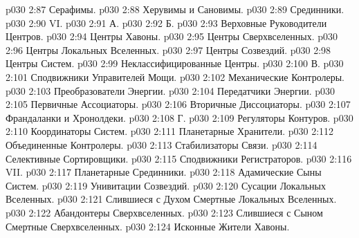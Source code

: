 \vs p030 2:87 \bibnobreakspace Серафимы.
\vs p030 2:88 \bibnobreakspace Херувимы и Сановимы.
\vs p030 2:89 \bibnobreakspace Срединники.
\vs p030 2:90 \pc VI. 
\vs p030 2:91 \pc А. 
\vs p030 2:92 \pc Б. 
\vs p030 2:93 \bibnobreakspace Верховные Руководители Центров.
\vs p030 2:94 \bibnobreakspace Центры Хавоны.
\vs p030 2:95 \bibnobreakspace Центры Сверхвселенных.
\vs p030 2:96 \bibnobreakspace Центры Локальных Вселенных.
\vs p030 2:97 \bibnobreakspace Центры Созвездий.
\vs p030 2:98 \bibnobreakspace Центры Систем.
\vs p030 2:99 \bibnobreakspace Неклассифицированные Центры.
\vs p030 2:100 \pc В. 
\vs p030 2:101 \bibnobreakspace Сподвижники Управителей Мощи.
\vs p030 2:102 \bibnobreakspace Механические Контролеры.
\vs p030 2:103 \bibnobreakspace Преобразователи Энергии.
\vs p030 2:104 \bibnobreakspace Передатчики Энергии.
\vs p030 2:105 \bibnobreakspace Первичные Ассоциаторы.
\vs p030 2:106 \bibnobreakspace Вторичные Диссоциаторы.
\vs p030 2:107 \bibnobreakspace Франдаланки и Хронолдеки.
\vs p030 2:108 \pc Г. 
\vs p030 2:109 \bibnobreakspace Регуляторы Контуров.
\vs p030 2:110 \bibnobreakspace Координаторы Систем.
\vs p030 2:111 \bibnobreakspace Планетарные Хранители.
\vs p030 2:112 \bibnobreakspace Объединенные Контролеры.
\vs p030 2:113 \bibnobreakspace Стабилизаторы Связи.
\vs p030 2:114 \bibnobreakspace Селективные Сортировщики.
\vs p030 2:115 \bibnobreakspace Сподвижники Регистраторов.
\vs p030 2:116 \pc VII. 
\vs p030 2:117 \bibnobreakspace Планетарные Срединники.
\vs p030 2:118 \bibnobreakspace Адамические Сыны Систем.
\vs p030 2:119 \bibnobreakspace Унивитации Созвездий.
\vs p030 2:120 \bibnobreakspace Сусации Локальных Вселенных.
\vs p030 2:121 \bibnobreakspace Слившиеся с Духом Смертные Локальных Вселенных.
\vs p030 2:122 \bibnobreakspace Абандонтеры Сверхвселенных.
\vs p030 2:123 \bibnobreakspace Слившиеся с Сыном Смертные Сверхвселенных.
\vs p030 2:124 \bibnobreakspace Исконные Жители Хавоны.
